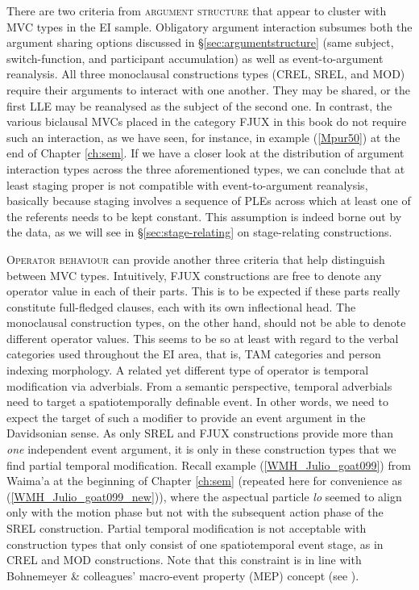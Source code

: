There are two criteria from \textsc{argument structure} that appear to cluster with MVC types in the EI sample. Obligatory argument interaction subsumes both the argument sharing options discussed in §\ref{sec:argumentstructure} (same subject, switch-function, and participant accumulation) as well as event-to-argument reanalysis. All three monoclausal constructions types (CREL, SREL, and MOD) require their arguments to interact with one another. They may be shared, or the first LLE may be reanalysed as the subject of the second one. In contrast, the various biclausal MVCs placed in the category FJUX in this book do not require such an interaction, as we have seen, for instance, in example (\ref{Mpur50}) at the end of Chapter \ref{ch:sem}. If we have a closer look at the distribution of argument interaction types across the three aforementioned types, we can conclude that at least staging proper is not compatible with event-to-argument reanalysis, basically because staging involves a sequence of PLEs across which at least one of the referents needs to be kept constant. This assumption is indeed borne out by the data, as we will see in §\ref{sec:stage-relating} on stage-relating constructions.

\textsc{Operator behaviour} can provide another three criteria that help distinguish between MVC types. Intuitively, FJUX constructions are free to denote any operator value in each of their parts. This is to be expected if these parts really constitute full-fledged clauses, each with its own inflectional head. The monoclausal construction types, on the other hand, should not be able to denote different operator values. This seems to be so at least with regard to the verbal categories used throughout the EI area, that is, TAM categories and person indexing morphology. A related yet different type of operator is temporal modification via adverbials. From a semantic perspective, temporal adverbials need to target a spatiotemporally definable event. In other words, we need to expect the target of such a modifier to provide an event argument in the Davidsonian sense. As only SREL and FJUX constructions provide more than \emph{one} independent event argument, it is only in these construction types that we find partial temporal modification. Recall example (\ref{WMH_Julio_goat099}) from Waima'a at the beginning of Chapter \ref{ch:sem} (repeated here for convenience as (\ref{WMH_Julio_goat099_new})), where the aspectual particle \textit{lo} seemed to align only with the motion phase but not with the subsequent action phase of the SREL construction. Partial temporal modification is not acceptable with construction types that only consist of one spatiotemporal event stage, as in CREL and MOD constructions. Note that this constraint is in line with Bohnemeyer \& colleagues' macro-event property (MEP) concept (see \citealt{bohnemeyer2007principles, bohnemeyer2011}).

